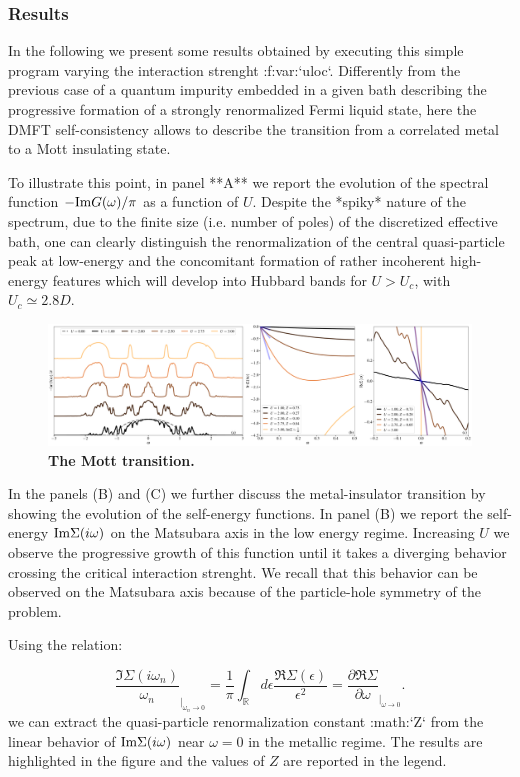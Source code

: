 \subsubsection{Results}
In the following we present some results obtained by executing this
simple program varying the interaction strenght :f:var:`uloc`.
Differently from the previous case of a quantum impurity embedded in a
given bath describing the progressive formation of a
strongly renormalized Fermi liquid state, here the DMFT
self-consistency allows to describe the transition from a correlated
metal to a Mott insulating state.


To illustrate this point, in panel **A** we report the evolution of
the spectral function $-{\rm Im}G(\omega)/\pi$ as a function of
$U$. Despite the *spiky* nature of the spectrum, due to the
finite size (i.e. number of poles) of the discretized effective bath,
one can clearly distinguish the renormalization of the central
quasi-particle peak at low-energy and the concomitant formation of
rather incoherent  high-energy features which will develop into
Hubbard bands for $U>U_c$, with $U_c\simeq 2.8D$. 


\begin{figure}[t!]
  \includegraphics[width=\linewidth]{figures/figBethe.pdf}
    \caption{\label{fig1}%
        \textbf{The Mott transition.}
        }
\end{figure}



In the panels (B) and (C) we further discuss the metal-insulator
transition by showing the evolution of the self-energy functions.
In panel (B) we report the self-energy ${\rm Im}\Sigma(i\omega)$
on the Matsubara axis in the low energy regime. Increasing $U$
we observe the progressive growth of this function until it takes a
diverging behavior crossing the critical interaction strenght. We
recall that this behavior can be observed on the Matsubara axis
because of the particle-hole symmetry of the problem.

Using the relation:

$$
   \frac{\Im\Sigma(i\omega_n)}{\omega_n}_{|_{\omega_n\rightarrow 0}}=
   \frac{1}{\pi}\int_{\mathbb R}d\epsilon \frac{\Re\Sigma(\epsilon)}{\epsilon^2}=
   \frac{\partial\Re\Sigma}{\partial\omega}_{|_{\omega\rightarrow 0}}.
$$
we can extract the quasi-particle renormalization constant :math:`Z`
from the linear behavior of ${\rm Im}\Sigma(i\omega)$ near
$\omega=0$ in the metallic regime. The results are highlighted
in the figure and the values of $Z$ are reported in the legend.

